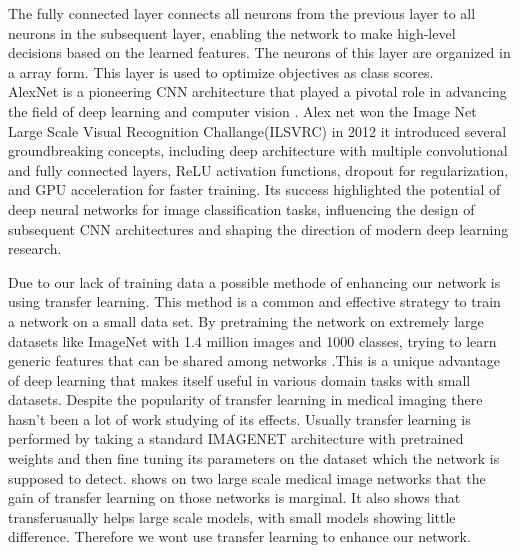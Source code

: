 \documentclass[
a4paper, 
12pt,
grayscalebody, %
abstract=on,
twoside, BCOR10mm, 12pt, DIV13,headinclude, footexclude, final, abstracton, openright
]{ibireprt}
\numberwithin{equation}{chapter}
\numberwithin{table}{chapter}
\numberwithin{figure}{chapter}
\numberwithin{algorithm}{chapter}
\numberwithin{example}{chapter}
\numberwithin{example}{chapter}
\begin{document}
The fully connected layer connects all neurons from the previous layer to all neurons in the subsequent layer, enabling the network to make high-level decisions based on the learned features. The neurons of this layer are organized in a array form. This layer is used to optimize objectives as class scores.\\

AlexNet is a pioneering CNN architecture that played a pivotal role in advancing the field of deep learning and computer vision \cite{Alzubaidi2021}. Alex net won the Image Net Large Scale Visual Recognition Challange(ILSVRC) in 2012 it introduced several groundbreaking concepts, including deep architecture  with multiple convolutional and fully connected layers, ReLU activation functions, dropout for regularization, and GPU acceleration for faster training. Its success highlighted the potential of deep neural networks for image classification tasks, influencing the design of subsequent CNN architectures and shaping the direction of modern deep learning research.

Due to our lack of training data a possible methode of enhancing our network is using transfer learning. This method is a common and effective strategy to train a network on a small data set. By pretraining the network on extremely large datasets like ImageNet with 1.4 million images and 1000 classes, trying to learn generic features that can be shared among networks \cite{Yamashita2018}.This is a unique advantage of deep learning that makes itself useful in various domain tasks with small datasets. Despite the popularity of transfer learning in medical imaging there hasn't been a lot of work studying of its effects. Usually transfer learning is performed by taking a standard IMAGENET architecture with pretrained weights and then fine tuning its parameters on the dataset which the network is supposed to detect.
\cite{NEURIPS2019_eb1e7832} shows on two large scale medical image networks that the gain of transfer learning on those networks is marginal. It also shows that transferusually helps large scale models, with small models showing little difference. Therefore we wont use transfer learning to enhance our network.
\end{document}
